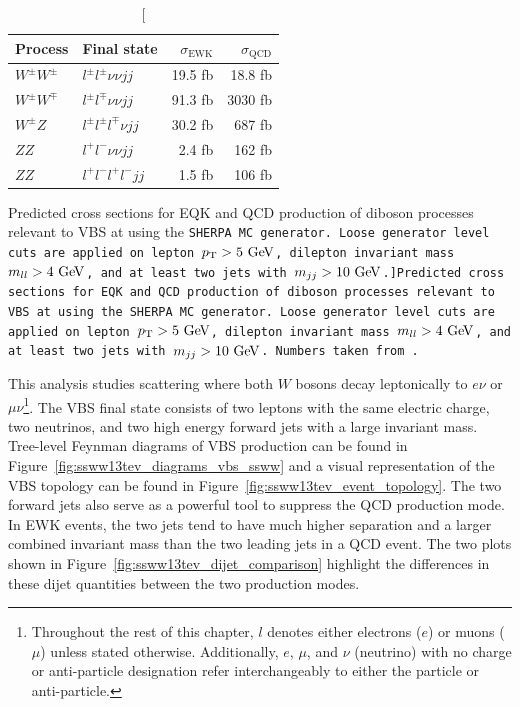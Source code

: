 
\begin{table}[htbp]
  \centering
  \begin{tabular}{l l r r}
    Process & Final state & $\sigma_{\textrm{EWK}}$ & $\sigma_{\textrm{QCD}}$ \\
    \hline\hline
    $W^{\pm}W^{\pm}$ & $l^{\pm}l^{\pm}\nu\nu jj$    & 19.5 fb & 18.8 fb \\
    $W^{\pm}W^{\mp}$ & $l^{\pm}l^{\mp}\nu\nu jj$    & 91.3 fb & 3030 fb \\
    $W^{\pm}Z$      & $l^{\pm}l^{\pm}l^{\mp}\nu jj$ & 30.2 fb & 687 fb  \\
    $ZZ$          & $l^{+}l^{-}\nu\nu jj$        & 2.4 fb  & 162 fb  \\
    $ZZ$          & $l^{+}l^{-}l^{+}l^{-} jj$     & 1.5 fb  & 106 fb \\
    \hline
  \end{tabular}
  \caption[Predicted cross sections for EQK and QCD production of diboson processes relevant to VBS at  using the \tt{SHERPA} MC generator.  Loose generator level cuts are applied on lepton $\pt > 5\gev$, dilepton invariant mass $m_{ll} > 4\gev$, and at least two jets with $m_{jj} > 10\gev$.]{Predicted cross sections for EQK and QCD production of diboson processes relevant to VBS at  using the \tt{SHERPA} MC generator.  Loose generator level cuts are applied on lepton $\pt > 5\gev$, dilepton invariant mass $m_{ll} > 4\gev$, and at least two jets with $m_{jj} > 10\gev$.  Numbers taken from~\cite{2013.ssww-8tev-atlas-support}.}
  \label{tab:ssww13tev_qcd_vs_ewk}
\end{table}

This analysis studies \ssww scattering where both $W$ bosons decay leptonically to $e\nu$ or $\mu\nu$\footnote{Throughout the rest of this chapter, $l$ denotes either electrons ($e$) or muons ($\mu$) unless stated otherwise.  Additionally, $e$, $\mu$, and $\nu$ (neutrino) with no charge or anti-particle designation refer interchangeably to either the particle or anti-particle.}.
The \ssww VBS final state consists of two leptons with the same electric charge, two neutrinos, and two high energy forward jets with a large invariant mass.
Tree-level Feynman diagrams of VBS \ssww production can be found in Figure~\ref{fig:ssww13tev_diagrams_vbs_ssww} and a visual representation of the VBS topology can be found in Figure~\ref{fig:ssww13tev_event_topology}.
The two forward jets also serve as a powerful tool to suppress the QCD production mode.
In EWK events, the two jets tend to have much higher separation and a larger combined invariant mass than the two leading jets in a QCD event.
The two plots shown in Figure~\ref{fig:ssww13tev_dijet_comparison} highlight the differences in these dijet quantities between the two production modes.

